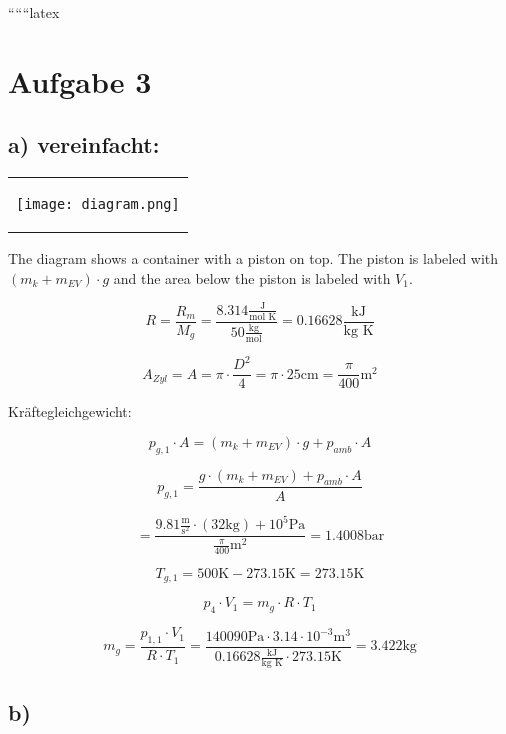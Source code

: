 
``````latex


\section*{Aufgabe 3}

\subsection*{a) vereinfacht:}

\begin{center}
\begin{tabular}{c}
\begin{minipage}{0.3\textwidth}
\begin{center}
\texttt{[image: diagram.png]}
\end{center}
\end{minipage}
\end{tabular}
\end{center}

\noindent
The diagram shows a container with a piston on top. The piston is labeled with $(m_k + m_{EV}) \cdot g$ and the area below the piston is labeled with $V_1$.

\[
R = \frac{R_m}{M_g} = \frac{8.314 \frac{\text{J}}{\text{mol K}}}{50 \frac{\text{kg}}{\text{mol}}} = 0.16628 \frac{\text{kJ}}{\text{kg K}}
\]

\[
A_{Zyl} = A = \pi \cdot \frac{D^2}{4} = \pi \cdot 25 \text{cm} = \frac{\pi}{400} \text{m}^2
\]

\noindent
Kräftegleichgewicht:

\[
p_{g,1} \cdot A = (m_k + m_{EV}) \cdot g + p_{amb} \cdot A
\]

\[
p_{g,1} = \frac{g \cdot (m_k + m_{EV}) + p_{amb} \cdot A}{A}
\]

\[
= \frac{9.81 \frac{\text{m}}{\text{s}^2} \cdot (32 \text{kg}) + 10^5 \text{Pa}}{\frac{\pi}{400} \text{m}^2} = 1.4008 \text{bar}
\]

\[
T_{g,1} = 500 \text{K} - 273.15 \text{K} = 273.15 \text{K}
\]

\[
p_{4} \cdot V_1 = m_g \cdot R \cdot T_1
\]

\[
m_g = \frac{p_{1,1} \cdot V_1}{R \cdot T_1} = \frac{140090 \text{Pa} \cdot 3.14 \cdot 10^{-3} \text{m}^3}{0.16628 \frac{\text{kJ}}{\text{kg K}} \cdot 273.15 \text{K}} = 3.422 \text{kg}
\]

\subsection*{b)}

